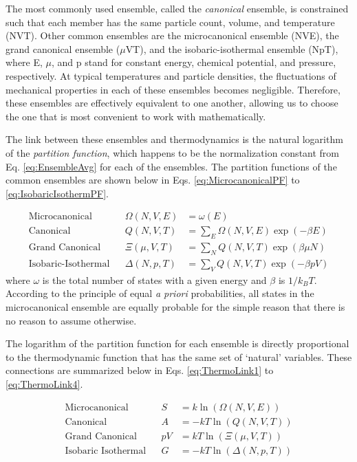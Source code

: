 The most commonly used ensemble, called the \emph{canonical} ensemble, is
constrained such that each member has the same particle count, volume, and
temperature (NVT). Other common ensembles are the microcanonical ensemble (NVE),
the grand canonical ensemble ($\mu$VT), and the isobaric-isothermal ensemble
(NpT), where E, $\mu$, and p stand for constant energy, chemical potential, and
pressure, respectively. At typical temperatures and particle densities, the
fluctuations of mechanical properties in each of these ensembles becomes
negligible. Therefore, these ensembles are effectively equivalent to one
another, allowing us to choose the one that is most convenient to work with
mathematically.

The link between these ensembles and thermodynamics is the natural logarithm of
the \emph{partition function}, which happens to be the normalization constant
from Eq. \ref{eq:EnsembleAvg} for each of the ensembles. The partition functions
of the common ensembles are shown below in Eqs. \ref{eq:MicrocanonicalPF} to
\ref{eq:IsobaricIsothermPF}.

\begin{align}
   \text{Microcanonical} && \Omega(N, V, E) & = \omega(E) 
      \label{eq:MicrocanonicalPF} \\
   \text{Canonical} && Q(N, V, T) & = \sum_E \Omega(N, V, E) 
               \exp(-\beta E) 
               \label{eq:CanonicalPF} \\
   \text{Grand Canonical} && \Xi(\mu, V, T) & = \sum _ N 
               Q(N, V, T) \exp(\beta \mu N) 
               \label{eq:GrandCanonicalPF} \\
   \text{Isobaric-Isothermal} && \Delta(N, p, T) & = \sum _ V
               Q(N, V, T) \exp(-\beta p V)
               \label{eq:IsobaricIsothermPF}
\end{align}
where $\omega$ is the total number of states with a given energy and $\beta$ is
$1 / k_BT$. According to the principle of equal \emph{a priori} probabilities,
all states in the microcanonical ensemble are equally probable for the simple
reason that there is no reason to assume otherwise.

The logarithm of the partition function for each ensemble is directly
proportional to the thermodynamic function that has the same set of `natural'
variables. These connections are summarized below in Eqs. \ref{eq:ThermoLink1}
to \ref{eq:ThermoLink4}. \cite{McQuarrie_Book_StatMech_1973}

\begin{align}
   \text{Microcanonical} && S & = k \ln \left ( \Omega (N, V, E) \right ) 
      \label{eq:ThermoLink1} \\
   \text{Canonical} && A & = -kT \ln \left ( Q (N, V, T) \right ) 
      \label{eq:ThermoLink2} \\
   \text{Grand Canonical} && p V & = kT \ln \left ( \Xi (\mu, V, T) \right ) 
      \label{eq:ThermoLink3} \\
   \text{Isobaric Isothermal} && G & = - kT \ln \left ( \Delta (N, p, T) \right )
      \label{eq:ThermoLink4}
\end{align}

